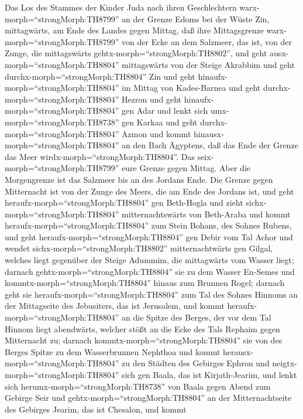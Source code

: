  Das Los des Stammes der Kinder Juda nach ihren
Geschlechtern warx-morph=``strongMorph:TH8799'' an der Grenze Edoms bei
der Wüste Zin, mittagwärts, am Ende des Landes gegen Mittag,
 daß ihre Mittagsgrenze warx-morph=``strongMorph:TH8799''
von der Ecke an dem Salzmeer, das ist, von der Zunge, die mittagswärts
gehtx-morph=``strongMorph:TH8802'',  und geht
ausx-morph=``strongMorph:TH8804'' mittagswärts von der Steige Akrabbim
und geht durchx-morph=``strongMorph:TH8804'' Zin und geht
hinaufx-morph=``strongMorph:TH8804'' im Mittag von Kades-Barnea und geht
durchx-morph=``strongMorph:TH8804'' Hezron und geht
hinaufx-morph=``strongMorph:TH8804'' gen Adar und lenkt sich
umx-morph=``strongMorph:TH8738'' gen Karkaa  und geht
durchx-morph=``strongMorph:TH8804'' Azmon und kommt
hinausx-morph=``strongMorph:TH8804'' an den Bach Ägyptens, daß das Ende
der Grenze das Meer wirdx-morph=``strongMorph:TH8804''. Das
seix-morph=``strongMorph:TH8799'' eure Grenze gegen Mittag. 
Aber die Morgengrenze ist das Salzmeer bis an des Jordans Ende. Die
Grenze gegen Mitternacht ist von der Zunge des Meers, die am Ende des
Jordans ist,  und geht heraufx-morph=``strongMorph:TH8804''
gen Beth-Hogla und zieht sichx-morph=``strongMorph:TH8804''
mitternachtswärts von Beth-Araba und kommt
heraufx-morph=``strongMorph:TH8804'' zum Stein Bohans, des Sohnes
Rubens,  und geht heraufx-morph=``strongMorph:TH8804'' gen
Debir vom Tal Achor und wendet sichx-morph=``strongMorph:TH8802''
mitternachtwärts gen Gilgal, welches liegt gegenüber der Steige Adummim,
die mittagwärts vom Wasser liegt; darnach
gehtx-morph=``strongMorph:TH8804'' sie zu dem Wasser En-Semes und
kommtx-morph=``strongMorph:TH8804'' hinaus zum Brunnen Rogel;
 darnach geht sie heraufx-morph=``strongMorph:TH8804'' zum
Tal des Sohnes Hinnoms an der Mittagseite des Jebusiters, das ist
Jerusalem, und kommt heraufx-morph=``strongMorph:TH8804'' an die Spitze
des Berges, der vor dem Tal Hinnom liegt abendwärts, welcher stößt an
die Ecke des Tals Rephaim gegen Mitternacht zu;  darnach
kommtx-morph=``strongMorph:TH8804'' sie von des Berges Spitze zu dem
Wasserbrunnen Nephthoa und kommt herausx-morph=``strongMorph:TH8804'' zu
den Städten des Gebirges Ephron und neigtx-morph=``strongMorph:TH8804''
sich gen Baala, das ist Kirjath-Jearim,  und lenkt sich
herumx-morph=``strongMorph:TH8738'' von Baala gegen Abend zum Gebirge
Seir und gehtx-morph=``strongMorph:TH8804'' an der Mitternachtseite des
Gebirges Jearim, das ist Chesalon, und kommt
